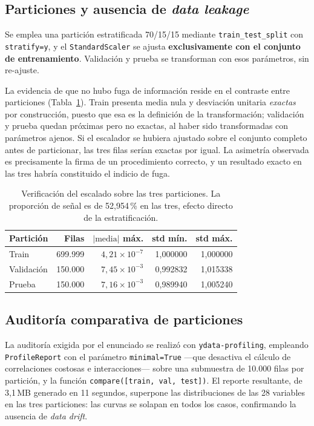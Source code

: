 \documentclass[12pt,a4paper]{article}
\begin{document}
\subsection{Particiones y ausencia de \emph{data leakage}}

Se emplea una partición estratificada 70/15/15 mediante \texttt{train\_test\_split} con
\texttt{stratify=y}, y el \texttt{StandardScaler} se ajusta \textbf{exclusivamente con el conjunto
de entrenamiento}. Validación y prueba se transforman con esos parámetros, sin re-ajuste.

La evidencia de que no hubo fuga de información reside en el contraste entre particiones
(Tabla~\ref{tab:leakage}). Train presenta media nula y desviación unitaria \emph{exactas} por
construcción, puesto que esa es la definición de la transformación; validación y prueba quedan
próximas pero no exactas, al haber sido transformadas con parámetros ajenos. Si el escalador se
hubiera ajustado sobre el conjunto completo antes de particionar, las tres filas serían exactas
por igual. La asimetría observada es precisamente la firma de un procedimiento correcto, y un
resultado exacto en las tres habría constituido el indicio de fuga.

\begin{table}[H]
\centering
\caption{Verificación del escalado sobre las tres particiones. La proporción de señal es de
52,954\,\% en las tres, efecto directo de la estratificación.}
\label{tab:leakage}
\begin{tabular}{lrrrr}
\toprule
\textbf{Partición} & \textbf{Filas} & $|\text{media}|$ \textbf{máx.} & \textbf{std mín.} & \textbf{std máx.} \\
\midrule
Train      & 699.999 & $4{,}21\times10^{-7}$ & 1,000000 & 1,000000 \\
Validación & 150.000 & $7{,}45\times10^{-3}$ & 0,992832 & 1,015338 \\
Prueba     & 150.000 & $7{,}16\times10^{-3}$ & 0,989940 & 1,005240 \\
\bottomrule
\end{tabular}
\end{table}

\subsection{Auditoría comparativa de particiones}

La auditoría exigida por el enunciado se realizó con \texttt{ydata-profiling}, empleando
\texttt{ProfileReport} con el parámetro \texttt{minimal=True} ---que desactiva el cálculo de
correlaciones costosas e interacciones--- sobre una submuestra de 10.000 filas por partición, y la
función \texttt{compare([train, val, test])}. El reporte resultante, de 3,1\,MB generado en 11
segundos, superpone las distribuciones de las 28 variables en las tres particiones: las curvas se
solapan en todos los casos, confirmando la ausencia de \emph{data drift}.
\end{document}
